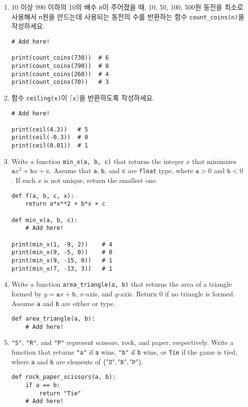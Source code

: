\documentclass[../main.tex]{subfiles}
\begin{document}
\begin{enumerate}
\item 10 이상 990 이하의 10의 배수 \verb|n|이 주어졌을 때, 10, 50, 100, 500원
  동전을 최소로 사용해서 \verb|n|원을 만드는데 사용되는 동전의 수를 반환하는
  함수 \verb|count_coins(n)|을 작성하세요.
\begin{verbatim}
# Add here!

print(count_coins(730))  # 6
print(count_coins(790))  # 8
print(count_coins(260))  # 4
print(count_coins(70))   # 3
\end{verbatim}

\item  함수 \texttt{ceiling(x)}이 $\lceil\texttt{x}\rceil$을
  반환하도록 작성하세요.
\begin{verbatim}
# Add here!

print(ceil(4.3))   # 5
print(ceil(-0.3))  # 0
print(ceil(0.01))  # 1
\end{verbatim}

\item  Write a function \verb/min_x(a, b, c)/ that returns the integer $x$ that minimizes $\texttt{a}x^2 + \texttt{b}x + \texttt{c}$.
Assume that \texttt{a}, \texttt{b}, and \texttt{c} are \texttt{float} type, where $\texttt{a} > 0$ and $\texttt{b} < 0$.
If such $x$ is not unique, return the smallest one.
\begin{verbatim}
def f(a, b, c, x):
    return a*x**2 + b*x + c

def min_x(a, b, c):
    # Add here!

print(min_x(1, -9, 2))    # 4
print(min_x(9, -5, 0))    # 0
print(min_x(9, -15, 0))   # 1
print(min_x(7, -13, 3))   # 1
\end{verbatim}

\item  Write a function \verb/area_triangle(a, b)/ that returns the area of a
  triangle formed by $y = \texttt{a}x + \texttt{b}$, $x$-axis, and $y$-axis.
  Return 0 if no triangle is formed. Assume \texttt{a} and \texttt{b} are
  either  or  type.

\begin{verbatim}
def area_triangle(a, b):
    # Add here!

\end{verbatim}

\item \texttt{"S"}, \texttt{"R"}, and \texttt{"P"} represent scissors, rock,
  and paper, respectively.  Write a function  that returns \texttt{"a"} if \texttt{a} wins, \texttt{"b"} if \texttt{b}
  wins, or \texttt{Tie} if the game is tied, where \texttt{a} and \texttt{b}
  are elements of $\{\texttt{"S"}, \texttt{"R"}, \texttt{"P"}\}$.
\begin{verbatim}
def rock_paper_scissors(a, b):
    if a == b:
        return "Tie"
    # Add here!


\end{verbatim}
\end{enumerate}
\end{document}
